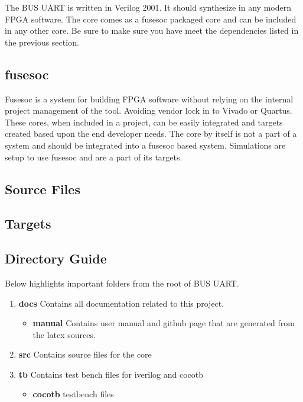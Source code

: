 \par
The BUS UART is written in Verilog 2001. It should synthesize in any modern FPGA software. The core comes as a fusesoc packaged core and can be
included in any other core. Be sure to make sure you have meet the dependencies listed in the previous section.

\subsection{fusesoc}
\par
Fusesoc is a system for building FPGA software without relying on the internal project management of the tool. Avoiding vendor lock in to Vivado or Quartus.
These cores, when included in a project, can be easily integrated and targets created based upon the end developer needs. The core by itself is not a part of
a system and should be integrated into a fusesoc based system. Simulations are setup to use fusesoc and are a part of its targets.

\subsection{Source Files}







\subsection{Targets}







\subsection{Directory Guide}

\par
Below highlights important folders from the root of BUS UART.

\begin{enumerate}
  \item \textbf{docs} Contains all documentation related to this project.
    \begin{itemize}
      \item \textbf{manual} Contains user manual and github page that are generated from the latex sources.
    \end{itemize}
  \item \textbf{src} Contains source files for the core
  \item \textbf{tb} Contains test bench files for iverilog and cocotb
    \begin{itemize}
      \item \textbf{cocotb} testbench files
    \end{itemize}
\end{enumerate}

